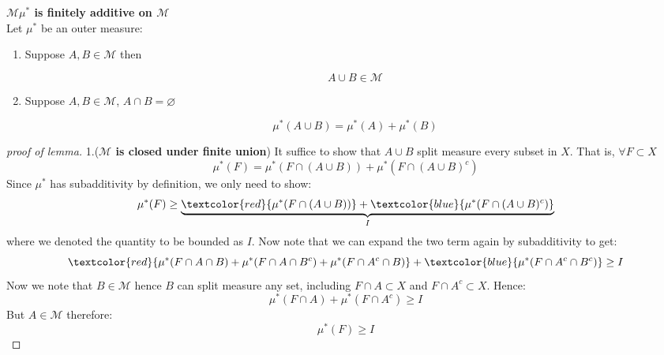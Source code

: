 \begin{lemma}\textbf{$\mathcal M$$\mu^{*}$ is finitely additive on $\mathcal M$}\\
Let $\mu^{*}$ be an outer measure:

\begin{enumerate}
\item Suppose $A,B\in \mathcal M$ then

\begin{equation}
A\cup B\in \mathcal M
\end{equation}


\item Suppose $A,B\in \mathcal M$, $A\cap B=\varnothing$

\begin{equation}
\mu^{*}(A \cup B) = \mu^*(A)+\mu^*(B)
\end{equation}
\end{enumerate}

\end{lemma}\begin{proof}[proof of lemma]1.(\textbf{$\mathcal M$ is closed under finite union}) It suffice to show that $A \cup B$ split measure every subset in $X$. That is, $\forall F\subset X$
\begin{equation}
\mu^*(F)=\mu^*(F\cap(A\cup B)) + \mu^*(F\cap(A\cup B)^c)
\end{equation}
Since $\mu^*$ has subadditivity by definition, we only need to show:
\begin{equation}
\mu^*(F)\geq \underbrace{\textcolor{red}{\mu^*(F\cap(A\cup B))} + \textcolor{blue}{\mu^*(F\cap(A\cup B)^c)}}_{I}
\end{equation}
where we denoted the quantity to be bounded as $I$. Now note that we can expand the two term again by subadditivity to get:
\begin{equation}
\textcolor{red}{\mu^*(F\cap A \cap B) + \mu^*(F\cap A \cap B^c)+\mu^*(F\cap A^c \cap B)} + \textcolor{blue}{\mu^*(F\cap A^c \cap B^c)}\geq I
\end{equation}
Now we note that $B\in \mathcal M$ hence $B$ can split measure any set, including $F\cap A\subset X$ and $F\cap A^c \subset X$. Hence:
\begin{equation}
\mu^*(F\cap A) +\mu^*(F \cap A^c)\geq I
\end{equation}
But $A \in \mathcal M$ therefore:
\begin{equation}
\mu^*(F)\geq I
\end{equation}


\end{proof}
